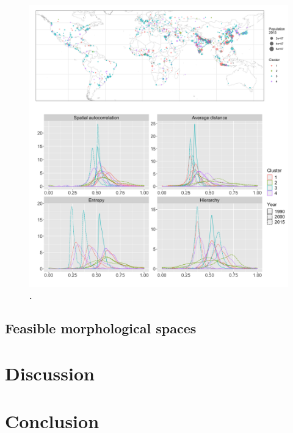 \documentclass[10pt]{article}
\begin{document}
\begin{figure}[!h]
	\includegraphics[width=\linewidth]{figures/Fig2.png}
	\caption{{\bf .}\label{fig:fig1}}
\end{figure}



\subsection*{Feasible morphological spaces}




\section*{Discussion}




\cite{raimbault:halshs-02406539}

\section*{Conclusion}
\end{document}
